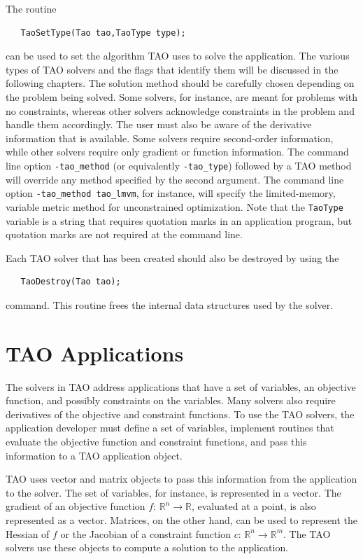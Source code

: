 \documentclass[]{book}
\newcommand{\R}{\mathbb R}
\renewcommand{\Re}{\R}
\begin{document}
The routine
\begin{verbatim}
   TaoSetType(Tao tao,TaoType type);
\end{verbatim}
\noindent
can be used to set the algorithm TAO uses to solve the application.
The various types of TAO solvers and the flags that identify them 
will be discussed in the following chapters.
The solution method should be carefully chosen depending on
the problem being solved.  Some solvers, for instance, are meant for
problems with no constraints, whereas other solvers acknowledge constraints
in the problem and handle them accordingly.
The user must also be aware of the derivative information that is available.
Some solvers require second-order information, while other solvers require
only gradient or function information.
The command line option \texttt{-tao\_method} (or equivalently 
\texttt{-tao\_type}) followed by a TAO method
will override any method specified by the second argument.
The command line option {\tt -tao\_method tao\_lmvm}, for instance,
will specify the limited-memory, variable metric method for unconstrained
optimization.  Note that the {\tt TaoType} variable is a string that requires
quotation marks in an application program, but quotation marks are not required
at the command line.

Each TAO solver that has been created should also be destroyed by using
the  
\begin{verbatim}
   TaoDestroy(Tao tao);
\end{verbatim}
command. 
This routine frees the internal data structures used by the solver.


\section{TAO Applications}
\label{sec_taoapplication}
\label{sec_petscapp}

The solvers in TAO address applications that have a set of variables, an objective
function, and possibly constraints on the variables.  Many solvers also
require derivatives
of the objective and constraint functions.
To use the TAO solvers, the application developer must 
define a set of variables, implement routines that evaluate the 
objective function and constraint functions, and pass this information
to a TAO application object.   

TAO uses vector and matrix objects to pass this information from the
application to the solver.   The set of variables, for instance, is
represented in a vector.
The gradient of an objective function $f: \, \Re^n \to \Re$,
evaluated at a point, is also represented as a vector.
Matrices,  on the other hand,
can be used to represent the Hessian of $f$ or the Jacobian of a constraint
function $c: \, \Re^n \to \Re^m$.  The TAO solvers use
these objects to compute a solution to the application.
\end{document}
